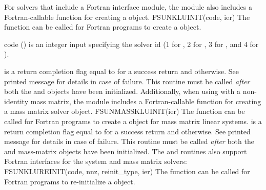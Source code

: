 For solvers that include a Fortran interface module, the
{\sunlinsolklu} module also includes a Fortran-callable function
for creating a  object.
{
  FSUNKLUINIT(code, ier)
}
{
  The function  can be called for Fortran programs
  to create a {\sunlinsolklu} object.
}
{
  \begin{args}[code]
  \item[code] ()
    is an integer input specifying the solver id (1 for {\cvode}, 2
    for {\ida}, 3 for {\kinsol}, and 4 for {\arkode}).
  \end{args}
}
{
   is a return completion flag equal to  for a success
  return and  otherwise. See printed message for details in case
  of failure.
}
{
  This routine must be
  called \emph{after} both the {\nvector} and {\sunmatrix} objects have
  been initialized.
}
Additionally, when using
{\arkode} with a non-identity mass matrix, the {\sunlinsolklu} module
includes a Fortran-callable function for creating a
 mass matrix solver object.
{
  FSUNMASSKLUINIT(ier)
}
{
  The function  can be called for Fortran programs
  to create a {\sunlinsolklu} object for mass matrix linear systems.
}
{
}
{
   is a  return completion flag equal to  for a success
  return and  otherwise. See printed message for details in case
  of failure.
}
{
  This routine must be
  called \emph{after} both the {\nvector} and {\sunmatrix} mass-matrix
  objects have been initialized.
}
The  and 
routines also support Fortran interfaces for the system and mass
matrix solvers: 
{
  FSUNKLUREINIT(code, nnz, reinit\_type, ier)
}
{
  The function  can be called for Fortran programs
  to re-initialize a {\sunlinsolklu} object.
}

